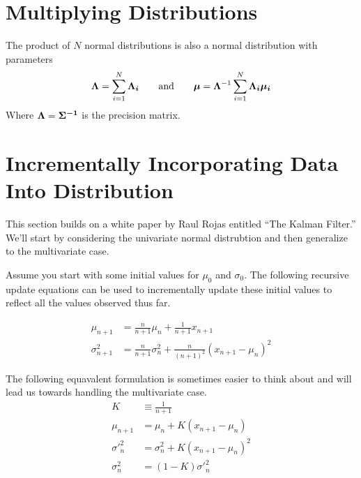 \documentclass[../../main.tex]{subfiles}
\begin{document}
\section{Multiplying Distributions}
The product of $N$ normal distributions is also a normal distribution with
parameters
\begin{equation}
    \label{eq:sumnormalmuvar}
    \boldsymbol{\Lambda} = \sum\limits_{i=1}^{N}\boldsymbol{\Lambda_i}
    \qquad\text{and}\qquad
    \boldsymbol{\mu} = \boldsymbol{\Lambda}^{-1}\sum\limits_{i=1}^{N}\boldsymbol{\Lambda_i\mu_i}
\end{equation}
Where $\boldsymbol{\Lambda} = \boldsymbol{\Sigma^{-1}}$ is the precision
matrix.


\section{Incrementally Incorporating Data Into Distribution}
This section builds on a white paper by Raul Rojas entitled ``The Kalman
Filter.''  We'll start by considering the univariate normal distrubtion
and then generalize to the multivariate case. 

Assume you start with some initial values for $\mu_0$ and $\sigma_0$.  The
following recursive update equations can be used to incrementally update these
initial values to reflect all the values observed thus far.

\begin{align}
    \label{eq:normalupdate1d}
    \mu_{n+1} &= \frac{n}{n + 1} \mu_n  + \frac{1}{n+1}x_{n+1} \\
    \sigma_{n+1}^2 &= \frac{n}{n + 1}\sigma_n^2
        + \frac{n}{(n+1)^2} \left( x_{n+1} - \mu_n \right) ^ 2\nonumber
\end{align}

The following equavalent formulation is sometimes easier to think
about and will lead us towards handling the multivariate case.
\begin{align}
    \label{eq:normalupdate1dwithgain}
    K &\equiv \frac{1}{n + 1}\\
    \mu_{n+1} &= \mu_n  + K \left( x_{n+1} - \mu_n \right)\nonumber\\
    {\sigma'}_n^2 &= \sigma_n^2 + K \left( x_{n+1} - \mu_n  \right)^2\nonumber\\
    \sigma_n^2 &= (1-K){\sigma'}_n^2\nonumber
\end{align}
\end{document}
